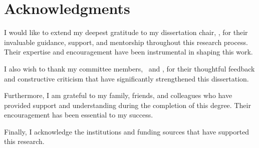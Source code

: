 \chapter*{Acknowledgments}

I would like to extend my deepest gratitude to my dissertation chair, \chairname, for their invaluable guidance, support, and mentorship throughout this research process. Their expertise and encouragement have been instrumental in shaping this work.

I also wish to thank my committee members, \committeemembertwo\ and \committeememberthree, for their thoughtful feedback and constructive criticism that have significantly strengthened this dissertation.

Furthermore, I am grateful to my family, friends, and colleagues who have provided support and understanding during the completion of this degree. Their encouragement has been essential to my success.

Finally, I acknowledge the institutions and funding sources that have supported this research.

\newpage